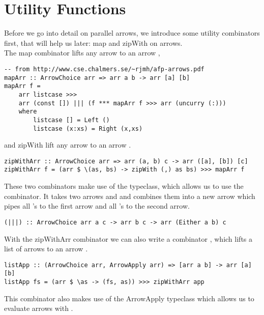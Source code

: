 \section{Utility Functions}\label{utilfns}
Before we go into detail on parallel arrows, we introduce some utility combinators first, that will help us later: map and zipWith on arrows.
\\
The map combinator lifts any arrow  to an arrow ,
\begin{lstlisting}[frame=htrbl]
-- from http://www.cse.chalmers.se/~rjmh/afp-arrows.pdf
mapArr :: ArrowChoice arr => arr a b -> arr [a] [b]
mapArr f =
	arr listcase >>>
	arr (const []) ||| (f *** mapArr f >>> arr (uncurry (:)))
	where
		listcase [] = Left ()
		listcase (x:xs) = Right (x,xs)
\end{lstlisting}
and zipWith lift any arrow  to an arrow .
\begin{lstlisting}[frame=htrbl]
zipWithArr :: ArrowChoice arr => arr (a, b) c -> arr ([a], [b]) [c]
zipWithArr f = (arr $ \(as, bs) -> zipWith (,) as bs) >>> mapArr f
\end{lstlisting}
These two combinators make use of the  typeclass, which allows us to use the \code{|||} combinator. It takes two arrows  and  and combines them into a new arrow  which pipes all 's to the first arrow and all 's to the second arrow.
\begin{lstlisting}[frame=htrbl]
(|||) :: ArrowChoice arr a c -> arr b c -> arr (Either a b) c
\end{lstlisting}
With the zipWithArr combinator we can also write a combinator , which lifts a list of arrows \code{[arr a b]} to an arrow .
\begin{lstlisting}[frame=htrbl]
listApp :: (ArrowChoice arr, ArrowApply arr) => [arr a b] -> arr [a] [b]
listApp fs = (arr $ \as -> (fs, as)) >>> zipWithArr app
\end{lstlisting}
This combinator also makes use of the ArrowApply typeclass which allows us to evaluate arrows with .
